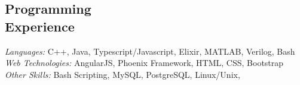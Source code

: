 \documentclass[margin,line]{resume}
\begin{document}
\begin{resume}
    \section{\mysidestyle Programming\\Experience}

    \emph{Languages:} C++, Java, Typescript/Javascript, Elixir, MATLAB, Verilog, Bash\\
    \emph{Web Technologies:} AngularJS, Phoenix Framework, HTML, CSS, Bootstrap\\
    \emph{Other Skills:} Bash Scripting, MySQL, PostgreSQL, Linux/Unix,
\end{resume}
\end{document}
